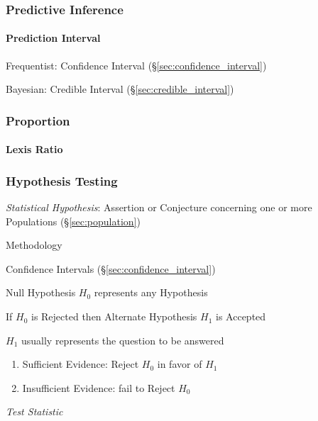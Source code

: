 \subsubsection{Predictive Inference}\label{sec:predictive_inference}

\paragraph{Prediction Interval}\label{sec:prediction_interval}\hfill

Frequentist: Confidence Interval (\S\ref{sec:confidence_interval})

Bayesian: Credible Interval (\S\ref{sec:credible_interval})



\subsubsection{Proportion}\label{sec:statistical_proportion}

\paragraph{Lexis Ratio}\label{sec:lexis_ratio}\hfill



\subsubsection{Hypothesis Testing}\label{sec:hypothesis_testing}

\emph{Statistical Hypothesis}: Assertion or Conjecture concerning one
or more Populations (\S\ref{sec:population})

Methodology

Confidence Intervals (\S\ref{sec:confidence_interval})

Null Hypothesis $H_0$ represents any Hypothesis

If $H_0$ is Rejected then Alternate Hypothesis $H_1$ is Accepted

$H_1$ usually represents the question to be answered

\begin{enumerate}
  \item Sufficient Evidence: Reject $H_0$ in favor of $H_1$
  \item Insufficient Evidence: fail to Reject $H_0$
\end{enumerate}

\emph{Test Statistic}


